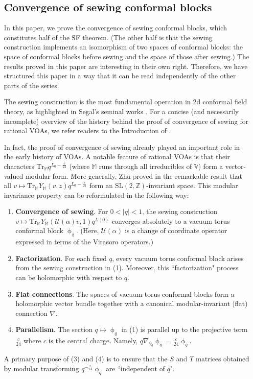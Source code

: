 \documentclass[11pt,b5paper,notitlepage]{article}
\theoremstyle{definition}
\theoremstyle{plain}
\newcommand{\mc}{\mathcal}
\newcommand{\Tr}{\mathrm{Tr}}
\newcommand{\Vbb}{\mathbb V}
\newcommand{\Mbb}{\mathbb M}
\newcommand{\Zbb}{\mathbb Z}
\newcommand{\<}{\left\langle}
\renewcommand{\>}{\right\rangle}
\numberwithin{equation}{section}
\begin{document}
\subsection{Convergence of sewing conformal blocks}\label{lbb62}





In this paper, we prove the convergence of sewing conformal blocks, which constitutes half of the SF theorem. (The other half is that the sewing construction implements an isomorphism of two spaces of conformal blocks: the space of conformal blocks before sewing and the space of those after sewing.) The results proved in this paper are interesting in their own right. Therefore, we have structured this paper in a way that it can be read independently of the other parts of the series.


The sewing construction is the most fundamental operation in 2d conformal field theory, as highlighted in Segal's seminal works \cite{Segal-CFT1,Segal-CFT2}. For a concise (and necessarily incomplete) overview of the history behind the proof of convergence of sewing for rational VOAs, we refer readers to the Introduction of \cite{Gui-sewingconvergence}.



In fact, the proof of convergence of sewing already played an important role in the early history of VOAs. A notable feature of rational VOAs is that their characters $\Tr_\Mbb q^{L_0-\frac c{24}}$ (where $\Mbb$ runs through all irreducibles of $\Vbb$) form a vector-valued modular form. More generally, Zhu proved in \cite{Zhu-modular-invariance} the remarkable result that all $v\mapsto \Tr_\Mbb Y_\Mbb(v,z)q^{L_0-\frac c{24}}$ form an $\mathrm{SL}(2,\Zbb)$-invariant space. This modular invariance property can be reformulated in the following way:

\begin{enumerate}[label=(\arabic*)]
\item \textbf{Convergence of sewing}. For $0<|q|<1$, the sewing construction $v\mapsto \Tr_\Mbb Y_\Mbb(\mc U(\alpha)v,1)q^{L(0)}$ converges absolutely to a vacuum torus conformal block $\upphi_q$. (Here, $\mc U(\alpha)$ is a change of coordinate operator expressed in terms of the Virasoro operators.)
\item \textbf{Factorization}. For each fixed $q$, every vacuum torus conformal block arises from the sewing construction in (1). Moreover, this ``factorization" process can be holomorphic with respect to $q$.
\item \textbf{Flat connections}. The spaces of vacuum torus conformal blocks form a holomorphic vector bundle together with a canonical modular-invariant (flat) connection $\nabla$. 
\item \textbf{Parallelism}. The section $q\mapsto \upphi_q$ in (1) is parallel up to the projective term $\frac c{24}$ where $c$ is the central charge. Namely, $q\nabla_{\partial_q}\upphi_q=\frac c{24}\upphi_q$.
\end{enumerate}
A primary purpose of (3) and (4) is to ensure that the $S$ and $T$ matrices obtained by modular transforming $q^{-\frac c{24}}\upphi_q$ are ``independent of $q$".
\end{document}

